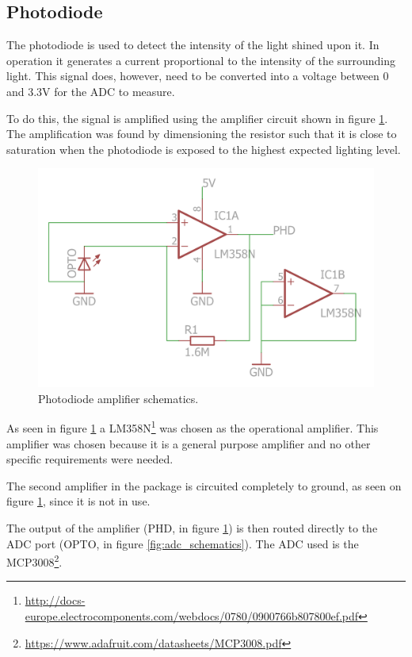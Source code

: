 

\subsection{Photodiode}
\label{sec:photodiode}


The photodiode is used to detect the intensity of the light shined upon it.
In operation it generates a current proportional to the intensity of the surrounding light.
This signal does, however, need to be converted into a voltage between 0 and 3.3V for the ADC to measure.

To do this, the signal is amplified using the amplifier circuit shown in figure \ref{fig:photodiodeschematics}.
The amplification was found by dimensioning the resistor such that it is close to saturation when the photodiode is exposed to the highest expected lighting level.


\begin{figure}[H]
\centering 
\includegraphics[width = 0.6 \textwidth]{images/optoamplifier_schematics}
\caption{Photodiode amplifier schematics.}
\label{fig:photodiodeschematics}
\end{figure}

As seen in figure \ref{fig:photodiodeschematics} a LM358N\footnote{\url{http://docs-europe.electrocomponents.com/webdocs/0780/0900766b807800ef.pdf}} was chosen as the operational amplifier.
This amplifier was chosen because it is  a general purpose amplifier and no other specific requirements were needed.

The second amplifier in the package is circuited completely to ground, as seen on figure \ref{fig:photodiodeschematics}, since it is not in use.

The output of the amplifier (PHD, in figure \ref{fig:photodiodeschematics}) is then routed directly to the ADC port (OPTO, in figure \ref{fig:adc_schematics}).
The ADC used is the MCP3008\footnote{ \url{https://www.adafruit.com/datasheets/MCP3008.pdf} }.


